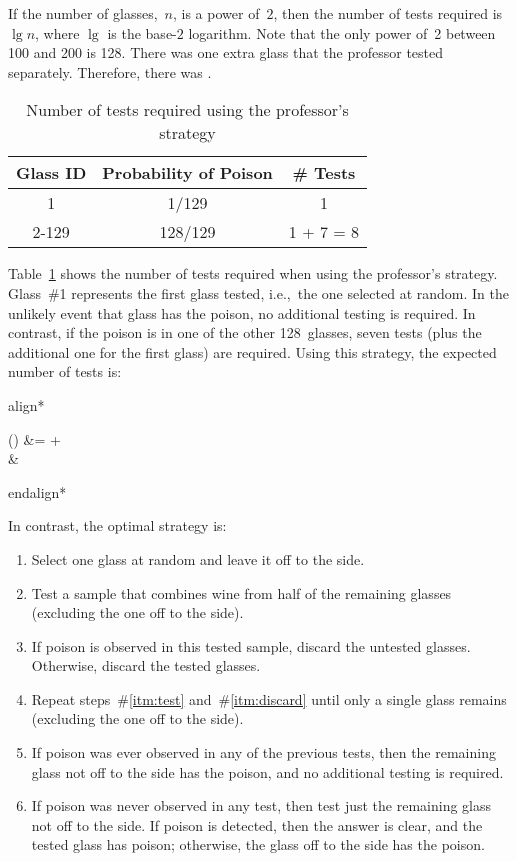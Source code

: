 \documentclass{report}
\newenvironment{aligncustom}
{ \csname align*\endcsname %
    \centering
}
{
  \csname endalign*\endcsname
}
\begin{document}
  If the number of glasses,~$n$, is a power of~$2$, then the number of tests required is $\lg n$, where $\lg$ is the base-$2$ logarithm.  Note that the only power of~2 between 100 and 200 is 128.  There was one extra glass that the professor tested separately.  Therefore, there was .

  \begin{table}[h]
    \centering
    \begin{tabular}{c|c|c}
      \hline
      Glass ID & Probability of Poison & \# Tests  \\\hline
      1        & 1/129                 & 1         \\\hline
      2-129    & 128/129               & 1 + 7 = 8 \\\hline
    \end{tabular}
    \caption{Number of tests required using the professor's strategy}\label{tab:problem5.9.20-Prof}
  \end{table}

  Table~\ref{tab:problem5.9.20-Prof} shows the number of tests required when using the professor's strategy.  Glass~\#1 represents the first glass tested, i.e.,~the one selected at random.  In the unlikely event that glass has the poison, no additional testing is required. In contrast, if the poison is in one of the other 128~glasses, seven tests (plus the additional one for the first glass) are required.  Using this strategy, the expected number of tests is:

  \begin{aligncustom}
    () &=   +   \\
                                            &\approx {}
  \end{aligncustom}


  In contrast, the optimal strategy is:

  \begin{enumerate}
    \item Select one glass at random and leave it off to the side.
    \item\label{itm:test} Test a sample that combines wine from half of the remaining glasses (excluding the one off to the side).
    \item\label{itm:discard} If poison is observed in this tested sample, discard the untested glasses.  Otherwise, discard the tested glasses.
    \item Repeat steps~\#\ref{itm:test} and~\#\ref{itm:discard} until only a single glass remains (excluding the one off to the side).
    \item If poison was ever observed in any of the previous tests, then the remaining glass not off to the side has the poison, and no additional testing is required.
    \item\label{itm:testRemaining} If poison was never observed in any test, then test just the remaining glass not off to the side. If poison is detected, then the answer is clear, and the tested glass has poison; otherwise, the glass off to the side has the poison.
  \end{enumerate}
\end{document}
